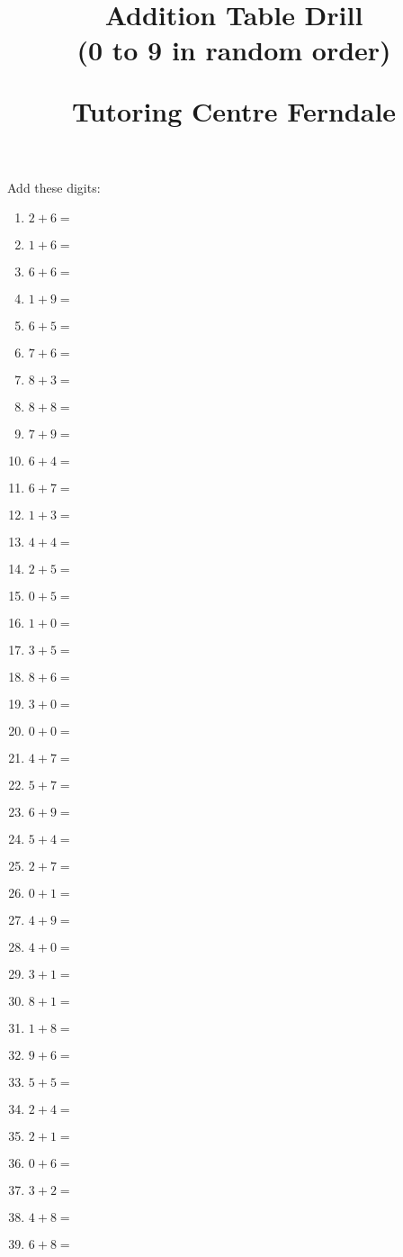 \documentclass{article}
\title{Addition Table Drill\\(0 to 9 in random order)\\
\begin{normalsize}
Tutoring Centre Ferndale
\end{normalsize}}
\author{}
\date{}
\begin{document}
\maketitle

\noindent Add these digits:

\begin{multicols}{5}
\begin{enumerate}

\item $2 + 6 =$
\item $1 + 6 =$
\item $6 + 6 =$
\item $1 + 9 =$
\item $6 + 5 =$
\item $7 + 6 =$
\item $8 + 3 =$
\item $8 + 8 =$
\item $7 + 9 =$
\item $6 + 4 =$
\item $6 + 7 =$
\item $1 + 3 =$
\item $4 + 4 =$
\item $2 + 5 =$
\item $0 + 5 =$
\item $1 + 0 =$
\item $3 + 5 =$
\item $8 + 6 =$
\item $3 + 0 =$
\item $0 + 0 =$
\item $4 + 7 =$
\item $5 + 7 =$
\item $6 + 9 =$
\item $5 + 4 =$
\item $2 + 7 =$
\item $0 + 1 =$
\item $4 + 9 =$
\item $4 + 0 =$
\item $3 + 1 =$
\item $8 + 1 =$
\item $1 + 8 =$
\item $9 + 6 =$
\item $5 + 5 =$
\item $2 + 4 =$
\item $2 + 1 =$
\item $0 + 6 =$
\item $3 + 2 =$
\item $4 + 8 =$
\item $6 + 8 =$

\end{enumerate}
\end{multicols}
\end{document}
